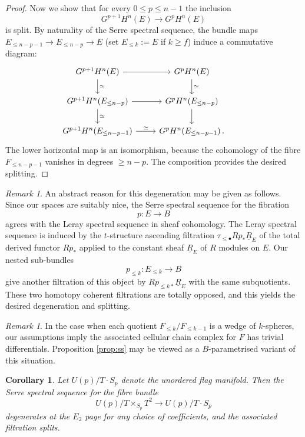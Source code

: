 \documentclass[oneside, 12pt, a4paper]{amsart}
\numberwithin{equation}{section}
\theoremstyle{plain}
\newtheorem{corollary}[theorem]{Corollary}
\theoremstyle{definition}
\theoremstyle{remark}
\newtheorem{remark}[theorem]{Remark}
\begin{document}
\begin{proof}
Now we show that for every $0\leq p\leq n-1$ the inclusion
\[
G^{p+1}H^n(E)\to G^{p}H^n(E)
\]
is split. By naturality of the Serre spectral sequence, the bundle maps $E_{\leq n-p-1}\to E_{\leq n-p}\to E$ (set $E_{\leq k}:=E$ if $k\geq f$) induce a commutative diagram:
 \[\begin{tikzcd}
    G^{p+1}H^n(E)\arrow[d,"\simeq"]\arrow[r]&G^{p}H^n(E)\arrow[d,"\simeq"]\\
     G^{p+1}H^n(E_{\leq n-p})\arrow[r]\arrow[d,"\simeq"]& G^{p}H^n(E_{\leq n-p})\arrow[d]\\
     G^{p+1}H^n(E_{\leq n-p-1})\arrow[r,"\simeq"]& G^{p}H^n(E_{\leq n-p-1})\, .&
 \end{tikzcd}\]
The lower horizontal map is an isomorphism, because the cohomology of the fibre $F_{\leq n-p-1}$ vanishes in degrees $\geq n-p$. The composition provides the desired splitting.
\end{proof}

\begin{remark}
An abstract reason for this degeneration may be given as follows. Since our spaces are suitably nice, the Serre spectral sequence for the fibration \[p:E\to B\] agrees with the Leray spectral sequence in sheaf cohomology. The Leray spectral sequence is induced by the $t$-structure ascending filtration $\tau_{\leq\bullet } Rp_* \underline{R}_E$ of the total derived functor $Rp_*$ applied to the constant sheaf $\underline{R}_E$ of $R$ modules on $E$. Our nested sub-bundles \[p_{\leq k}:E_{\leq k}\to B\] give another filtration of this object by $Rp_{\leq k\ast}\underline{R}_E$ with the same subquotients. These two homotopy coherent filtrations are totally opposed, and this yields the desired degeneration and splitting.
\end{remark}

\begin{remark}
In the case when each quotient $F_{\leq k}/F_{\leq k-1}$ is a wedge of $k$-spheres, our assumptions imply the associated cellular chain complex for $F$ has trivial differentials. Proposition \ref{prop:ss} may be viewed as a $B$-parametrised variant of this situation.
\end{remark}

\begin{corollary}\label{cor:degen U(p)}
Let $U(p)/T\cdot S_p$ denote the unordered flag manifold. Then the Serre spectral sequence for the fibre bundle \[U(p)/T\times_{S_p} T^2\to U(p)/T\cdot S_p\] degenerates at the $E_2$ page for any choice of coefficients, and the associated filtration splits.
\end{corollary}
\end{document}
